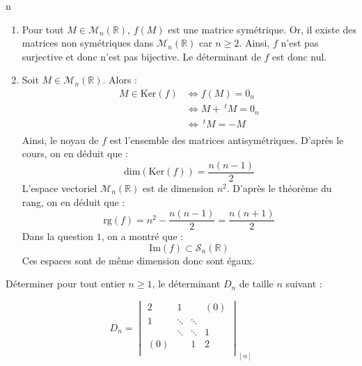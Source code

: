 n\documentclass[a4paper,10pt]{report}
\begin{document}
\begin{enumerate}
\item Pour tout $M \in \mathcal{M}_n(\mathbb{R})$, $f(M)$ est une matrice symétrique. Or, il existe des matrices non symétriques dans $\mathcal{M}_n(\mathbb{R})$ car $n \geq 2$. Ainsi, $f$ n'est pas surjective et donc n'est pas bijective. Le déterminant de $f$ est donc nul.
\item Soit $M \in \mathcal{M}_n(\mathbb{R})$. Alors :
\begin{align*}
M \in \textrm{Ker}(f) & \Longleftrightarrow f(M)=0_n \\
& \Longleftrightarrow M+~^tM= 0_n \\
& \Longleftrightarrow ~^tM=-M \\
\end{align*}
Ainsi, le noyau de $f$ est l'ensemble des matrices antisymétriques. D'après le cours, on en déduit que :
$$ \textrm{dim}(\textrm{Ker}(f)) = \dfrac{n(n-1)}{2}$$
L'espace vectoriel $\mathcal{M}_n(\mathbb{R})$ est de dimension $n^2$. D'après le théorème du rang, on en déduit que :
$$ \textrm{rg}(f) = n^2 - \dfrac{n(n-1)}{2} = \dfrac{n(n+1)}{2}$$
Dans la question $1$, on a montré que :
$$ \textrm{Im}(f) \subset \mathcal{S}_n(\mathbb{R})$$
Ces espaces sont de même dimension donc sont égaux.
\end{enumerate}

\begin{Exercice}{} Déterminer pour tout entier $n \geq 1$, le déterminant $D_n$ de taille $n$ suivant :

\[
    D_n =
    \begin{vmatrix}
        2 & 1 & {} & {(0)} \\
        1 & \ddots & \ddots & {} \\
        {} & \ddots & \ddots & 1 \\
        {(0)} & {} & 1 & 2 \\
    \end{vmatrix}_{[n]}
    \]
\end{Exercice} 
\end{document}
